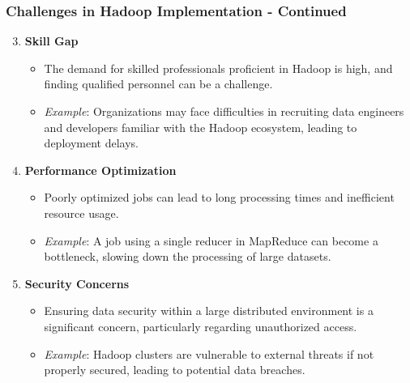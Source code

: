 \documentclass[aspectratio=169]{beamer}
\begin{document}
\begin{frame}[fragile]
    \frametitle{Challenges in Hadoop Implementation - Continued}
    \begin{enumerate}
        \setcounter{enumi}{2}
        \item \textbf{Skill Gap}
        \begin{itemize}
            \item The demand for skilled professionals proficient in Hadoop is high, and finding qualified personnel can be a challenge.
            \item \textit{Example}: Organizations may face difficulties in recruiting data engineers and developers familiar with the Hadoop ecosystem, leading to deployment delays.
        \end{itemize}

        \item \textbf{Performance Optimization}
        \begin{itemize}
            \item Poorly optimized jobs can lead to long processing times and inefficient resource usage.
            \item \textit{Example}: A job using a single reducer in MapReduce can become a bottleneck, slowing down the processing of large datasets.
        \end{itemize}

        \item \textbf{Security Concerns}
        \begin{itemize}
            \item Ensuring data security within a large distributed environment is a significant concern, particularly regarding unauthorized access.
            \item \textit{Example}: Hadoop clusters are vulnerable to external threats if not properly secured, leading to potential data breaches.
        \end{itemize}
    \end{enumerate}
\end{frame}
\end{document}
